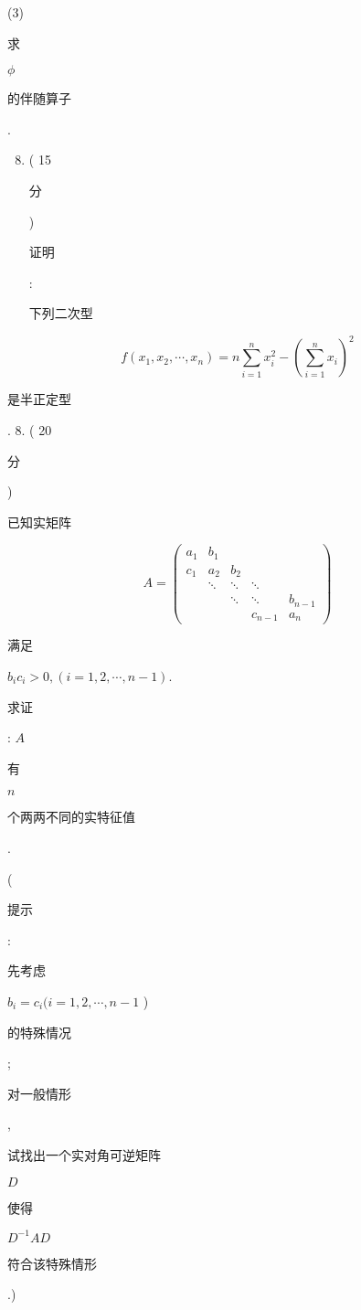 \documentclass[10pt]{article}
\begin{document}
(3) \begin{CJK}{UTF8}{mj}求\end{CJK} $\phi$ \begin{CJK}{UTF8}{mj}的伴随算子\end{CJK}.

\begin{enumerate}
  \setcounter{enumi}{7}
  \item ( 15 \begin{CJK}{UTF8}{mj}分\end{CJK}) \begin{CJK}{UTF8}{mj}证明\end{CJK}: \begin{CJK}{UTF8}{mj}下列二次型\end{CJK}
\end{enumerate}
$$
f\left(x_{1}, x_{2}, \cdots, x_{n}\right)=n \sum_{i=1}^{n} x_{i}^{2}-\left(\sum_{i=1}^{n} x_{i}\right)^{2}
$$
\begin{CJK}{UTF8}{mj}是半正定型\end{CJK}. 8. ( 20 \begin{CJK}{UTF8}{mj}分\end{CJK}) \begin{CJK}{UTF8}{mj}已知实矩阵\end{CJK}
$$
A=\left(\begin{array}{ccccc}
a_{1} & b_{1} & & & \\
c_{1} & a_{2} & b_{2} & & \\
& \ddots & \ddots & \ddots & \\
& & \ddots & \ddots & b_{n-1} \\
& & & c_{n-1} & a_{n}
\end{array}\right)
$$
\begin{CJK}{UTF8}{mj}满足\end{CJK} $b_{i} c_{i}>0,(i=1,2, \cdots, n-1)$. \begin{CJK}{UTF8}{mj}求证\end{CJK}: $A$ \begin{CJK}{UTF8}{mj}有\end{CJK} $n$ \begin{CJK}{UTF8}{mj}个两两不同的实特征值\end{CJK}.

(\begin{CJK}{UTF8}{mj}提示\end{CJK}: \begin{CJK}{UTF8}{mj}先考虑\end{CJK} $b_{i}=c_{i}(i=1,2, \cdots, n-1$ ) \begin{CJK}{UTF8}{mj}的特殊情况\end{CJK}; \begin{CJK}{UTF8}{mj}对一般情形\end{CJK}, \begin{CJK}{UTF8}{mj}试找出一个实对角可逆矩阵\end{CJK} $D$ \begin{CJK}{UTF8}{mj}使得\end{CJK} $D^{-1} A D$ \begin{CJK}{UTF8}{mj}符合该特殊情形\end{CJK}.)
\end{document}
